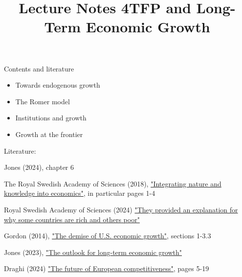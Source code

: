 \documentclass[10pt,handout]{beamer}
\title{Lecture Notes 4\newline TFP and Long-Term Economic Growth}
\begin{document}
\maketitle


\begin{frame}{Contents and literature}
    \begin{itemize}
        \item Towards endogenous growth
        \item The Romer model
        \item Institutions and growth
        \item Growth at the frontier
    \end{itemize}
    \bigskip

    Literature: 
    \small{
    \begin{tightitemize}
        \item Jones (2024), chapter 6
        \item The Royal Swedish Academy of Sciences (2018), \href{https://www.nobelprize.org/uploads/2018/10/popular-economicsciencesprize2018.pdf}{"Integrating nature and knowledge into economics"}, in particular pages 1-4
        \item Royal Swedish Academy of Sciences (2024) \href{https://www.nobelprize.org/uploads/2024/10/popular-economicsciencesprize2024.pdf}{"They provided an explanation for why some countries are rich and others poor"}
        \item Gordon (2014), \href{https://www.nber.org/system/files/working_papers/w19895/w19895.pdf}{"The demise of U.S. economic growth"}, sections 1-3.3
        \item Jones (2023), \href{https://www.kansascityfed.org/Jackson\%20Hole/documents/9771/GrowthOutlookPanel.pdf}{"The outlook for long-term economic growth"}
        \item Draghi (2024) \href{https://commission.europa.eu/document/download/97e481fd-2dc3-412d-be4c-f152a8232961_en?filename=The\%20future\%20of\%20European\%20competitiveness\%20_\%20A\%20competitiveness\%20strategy\%20for\%20Europe.pdf}{"The future of European competitiveness"}, pages 5-19
    \end{tightitemize}
    }
\end{frame}



\end{document}

